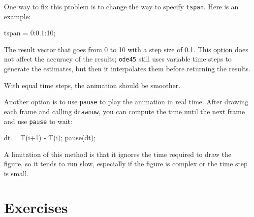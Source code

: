 \documentclass[
]{book}
\numberwithin{Answer}{chapter}
\numberwithin{Exercise}{chapter}
\begin{document}
One way to fix this problem is to change the way to specify {\tt tspan}.
Here is an example:

\begin{code}
    tspan = 0:0.1:10;
\end{code}

The result vector that goes from 0 to 10 with a
step size of 0.1.  This option does not affect the accuracy of the results; {\tt ode45} still uses variable time steps to generate the estimates, but then it interpolates them before returning the results.

With equal time steps, the animation should be smoother.

Another option is to use {\tt pause} to play the animation in
real time.  After drawing each frame and calling
{\tt drawnow}, you can compute the time
until the next frame and use {\tt pause} to wait:

\begin{code}
    dt = T(i+1) - T(i);
    pause(dt);
\end{code}

A limitation of this method is that it ignores the time required to
draw the figure, so it tends to run slow, especially if the figure is
complex or the time step is small.





\section{Exercises}
\end{document}
